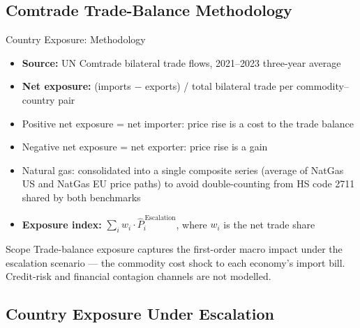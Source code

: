 ﻿\documentclass[aspectratio=1610]{beamer}
\begin{document}
\subsection{Comtrade Trade-Balance Methodology}

\begin{frame}[shrink=10]{Country Exposure: Methodology}

  \begin{itemize}
    \item \textbf{Source:} UN Comtrade bilateral trade flows, 2021--2023 three-year average
    \item \textbf{Net exposure:} (imports $-$ exports) / total bilateral trade
          per commodity--country pair
    \item Positive net exposure = net importer: price rise is a cost to the
          trade balance
    \item Negative net exposure = net exporter: price rise is a gain
    \item Natural gas: consolidated into a single composite series (average of
          NatGas US and NatGas EU price paths) to avoid double-counting from
          HS code 2711 shared by both benchmarks
    \item \textbf{Exposure index:}
          $\sum_i w_i \cdot \hat{P}_i^{\,\text{Escalation}}$,
          where $w_i$ is the net trade share
  \end{itemize}

  \begin{alertblock}{Scope}
    Trade-balance exposure captures the first-order macro impact under the
    escalation scenario --- the commodity cost shock to each economy's import bill.
    Credit-risk and financial contagion channels are not modelled.
  \end{alertblock}

\end{frame}

\subsection{Country Exposure Under Escalation}
\end{document}
